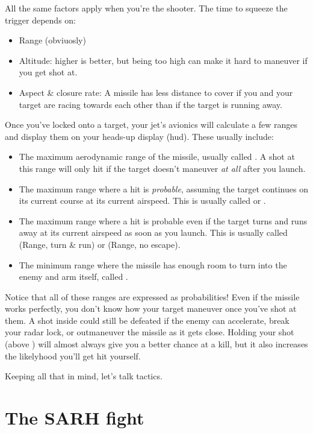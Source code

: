 All the same factors apply when you're the shooter.
The time to squeeze the trigger depends on:
\begin{itemize}
\item Range (obviuosly)
\item Altitude: higher is better, but being too high can make it hard to
    maneuver if you get shot at.
\item Aspect \& closure rate:
    A missile has less distance to cover if you and your target are racing
    towards each other than if the target is running away.
\end{itemize}
Once you've locked onto a target,
your jet's avionics will calculate a few ranges and display them on your
heads-up display \ac{(hud)}.
These usually include:
\begin{itemize}
\item The maximum aerodynamic range of the missile, usually called
    .
    A shot at this range will only hit if the target doesn't maneuver
    \emph{at all} after you launch.
\item The maximum range where a hit is \emph{probable},
    assuming the target continues on its current course at its current airspeed.
    This is usually called  or .
\item The maximum range where a hit is probable
    even if the target turns and runs away at its current airspeed
    as soon as you launch.
    This is usually called  (Range, turn \& run)
    or  (Range, no escape).
\item The minimum range where the missile has enough room to turn into the
    enemy and arm itself, called .
\end{itemize}
Notice that all of these ranges are expressed as probabilities!
Even if the missile works perfectly,
you don't know how your target maneuver once you've shot at them.
A shot inside  could still be defeated if the enemy can accelerate,
break your radar lock, or outmaneuver the missile as it gets close.
Holding your shot (above ) will almost always give you
a better chance at a kill,
but it also increases the likelyhood you'll get hit yourself.

Keeping all that in mind, let's talk tactics.

\section{The SARH fight}

